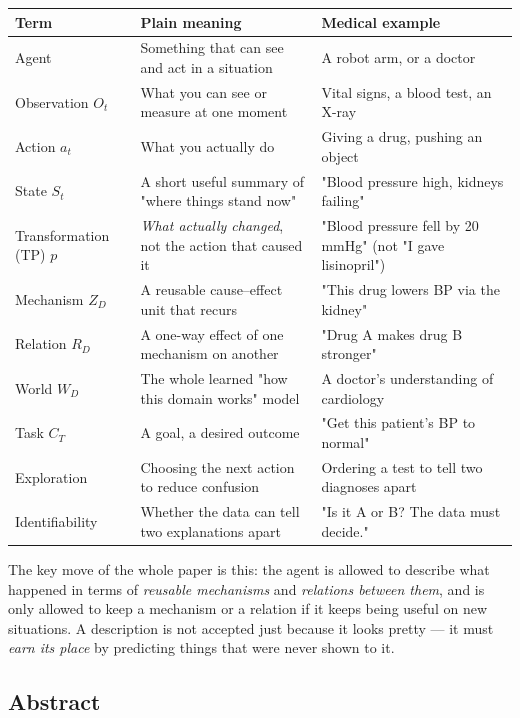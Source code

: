 \documentclass[11pt]{article}
\newenvironment{plainword}{%
  \par\medskip\noindent\begin{minipage}{\textwidth}%
  \color{gray!75!black}\small\itshape
}{%
  \end{minipage}\par\medskip}
\begin{document}
\begin{center}
\small
\begin{tabularx}{\textwidth}{@{}p{}p{}X@{}}
\toprule
Term & Plain meaning & Medical example \\
\midrule
Agent & Something that can see and act in a situation & A robot arm, or a doctor \\
Observation $O_t$ & What you can see or measure at one moment & Vital signs, a blood test, an X-ray \\
Action $a_t$ & What you actually do & Giving a drug, pushing an object \\
State $S_t$ & A short useful summary of "where things stand now" & "Blood pressure high, kidneys failing" \\
Transformation (TP) $p$ & \emph{What actually changed}, not the action that caused it & "Blood pressure fell by 20\,mmHg" (not "I gave lisinopril") \\
Mechanism $Z_D$ & A reusable cause--effect unit that recurs & "This drug lowers BP via the kidney" \\
Relation $R_D$ & A one-way effect of one mechanism on another & "Drug A makes drug B stronger" \\
World $W_D$ & The whole learned "how this domain works" model & A doctor's understanding of cardiology \\
Task $C_T$ & A goal, a desired outcome & "Get this patient's BP to normal" \\
Exploration & Choosing the next action to reduce confusion & Ordering a test to tell two diagnoses apart \\
Identifiability & Whether the data can tell two explanations apart & "Is it A or B? The data must decide." \\
\bottomrule
\end{tabularx}
\end{center}

\begin{plainword}
The key move of the whole paper is this: the agent is allowed to describe what happened in terms of \emph{reusable mechanisms}
and \emph{relations between them}, and is only allowed to keep a mechanism or a relation if it keeps being useful on new situations.
A description is not accepted just because it looks pretty --- it must \emph{earn its place} by predicting things that were never shown to it.
\end{plainword}

\subsection*{Abstract}
\end{document}

